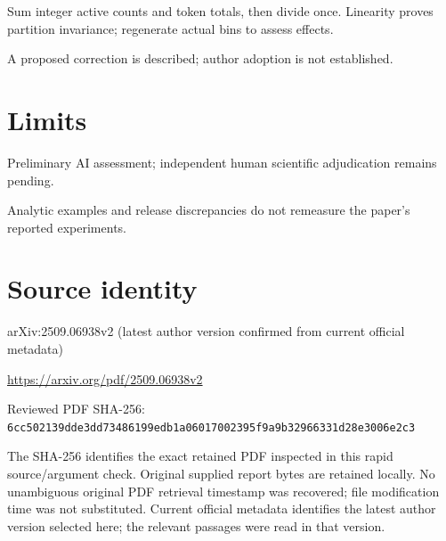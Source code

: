 \documentclass[11pt]{article}
\begin{document}
Sum integer active counts and token totals, then divide once. Linearity proves partition invariance; regenerate actual bins to assess effects.

A proposed correction is described; author adoption is not established.

\section*{Limits}

Preliminary AI assessment; independent human scientific adjudication remains pending.\par

Analytic examples and release discrepancies do not remeasure the paper’s reported experiments.\par

\section*{Source identity}

arXiv:2509.06938v2 (latest author version confirmed from current official metadata)

\url{https://arxiv.org/pdf/2509.06938v2}

Reviewed PDF SHA-256: \nolinkurl{6cc502139dde3dd73486199edb1a06017002395f9a9b32966331d28e3006e2c3}

The SHA-256 identifies the exact retained PDF inspected in this rapid source/argument check. Original supplied report bytes are retained locally. No unambiguous original PDF retrieval timestamp was recovered; file modification time was not substituted. Current official metadata identifies the latest author version selected here; the relevant passages were read in that version.
\end{document}
